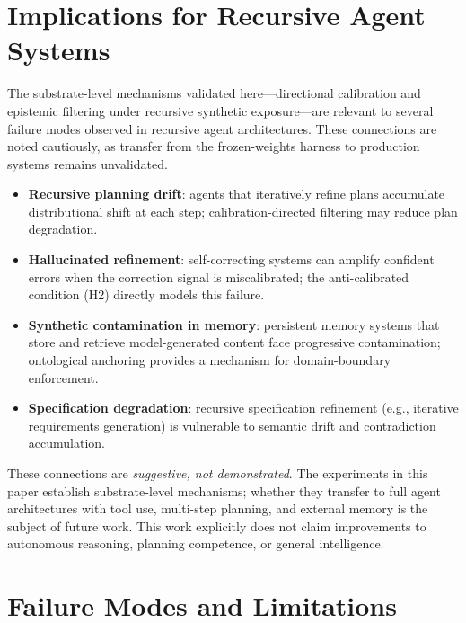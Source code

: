 \documentclass[11pt]{article}
\begin{document}
\section{Implications for Recursive Agent Systems}
\label{sec:implications}

The substrate-level mechanisms validated here---directional calibration and epistemic filtering under recursive synthetic exposure---are relevant to several failure modes observed in recursive agent architectures. These connections are noted cautiously, as transfer from the frozen-weights harness to production systems remains unvalidated.

\begin{itemize}[noitemsep]
  \item \textbf{Recursive planning drift}: agents that iteratively refine plans accumulate distributional shift at each step; calibration-directed filtering may reduce plan degradation.
  \item \textbf{Hallucinated refinement}: self-correcting systems can amplify confident errors when the correction signal is miscalibrated; the anti-calibrated condition (H2) directly models this failure.
  \item \textbf{Synthetic contamination in memory}: persistent memory systems that store and retrieve model-generated content face progressive contamination; ontological anchoring provides a mechanism for domain-boundary enforcement.
  \item \textbf{Specification degradation}: recursive specification refinement (e.g., iterative requirements generation) is vulnerable to semantic drift and contradiction accumulation.
\end{itemize}

These connections are \emph{suggestive, not demonstrated}. The experiments in this paper establish substrate-level mechanisms; whether they transfer to full agent architectures with tool use, multi-step planning, and external memory is the subject of future work. This work explicitly does not claim improvements to autonomous reasoning, planning competence, or general intelligence.

\section{Failure Modes and Limitations}
\label{sec:limitations}
\end{document}
